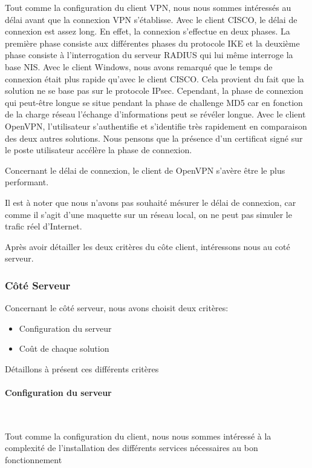 Tout comme la configuration du client VPN, nous nous sommes intéressés au délai avant que la connexion VPN s'établisse.
Avec le client CISCO, le délai de connexion est assez long. En effet, la connexion s'effectue en deux phases. La première phase consiste aux différentes phases du protocole IKE et la deuxième phase consiste à l'interrogation du serveur RADIUS qui lui même interroge la base NIS. 
Avec le client Windows, nous avons remarqué que le temps de connexion était plus rapide qu'avec le client CISCO. Cela provient du fait que la solution ne se base pas sur le protocole IPsec. Cependant, la phase de connexion qui peut-être longue se situe pendant la phase de challenge MD5 car en fonction de la charge réseau l'échange d'informations peut se révéler longue.
Avec le client OpenVPN, l'utilisateur s'authentifie et s'identifie très rapidement en comparaison des deux autres solutions. Nous pensons que la présence d'un certificat signé sur le poste utilisateur accélère la phase de connexion.

Concernant le délai de connexion, le client de OpenVPN s'avère être le plus performant.

Il est à noter que nous n'avons pas souhaité mésurer le délai de connexion, car comme il s'agit d'une maquette sur un réseau local, on ne peut pas simuler le trafic réel d'Internet.

Après avoir détailler les deux critères du côte client, intéressons nous au coté serveur.



\subsubsection{Côté Serveur}

Concernant le côté serveur, nous avons choisit deux critères:
\begin{itemize}
 	\item Configuration du serveur
	\item Coût de chaque solution 
\end{itemize}

Détaillons à présent ces différents critères

\paragraph{Configuration du serveur}
~\


Tout comme la configuration du client, nous nous sommes intéressé à la complexité de l'installation des différents services nécessaires au bon fonctionnement 

